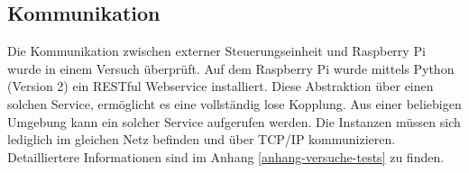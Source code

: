 \subsection{Kommunikation}
Die Kommunikation zwischen externer Steuerungseinheit und Raspberry Pi wurde in einem Versuch überprüft. Auf dem Raspberry Pi wurde mittels Python (Version 2) ein RESTful Webservice installiert. Diese Abstraktion über einen solchen Service, ermöglicht es eine vollständig lose Kopplung. Aus einer beliebigen Umgebung kann ein solcher Service aufgerufen werden. Die Instanzen müssen sich lediglich im gleichen Netz befinden und über TCP/IP kommunizieren. Detailliertere Informationen sind im Anhang \ref{anhang-versuche-tests} zu finden.